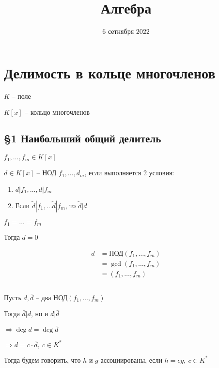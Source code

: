 


    \title{Алгебра}
    \date{6 сетнября 2022}
    \maketitle

    \pagebreak

    \section*{Делимость в кольце многочленов}

    $K$ -- поле
    \par $K[x]$ -- кольцо многочленов

    \subsection*{\S1 Наибольший общий делитель}

    \begin{definition}
        $f_1, \dots, f_m \in K[x]$
        \par \quad $d \in K[x]$ -- НОД $f_1, \dots, d_m$, если выполняется 2 условия:
        \begin{enumerate}
            \item $d | f_1, \dots, d | f_m$
            \item Если $\tilde d | f_1, \dots \tilde d | f_m$, то $\tilde d | d$
        \end{enumerate}
    \end{definition}

    \begin{illustration}
        $f_1 = \dots = f_m$
        \par \quad Тогда $d = 0$
    \end{illustration}

    \begin{remark}[Обозначение]
        \begin{align*}
            d &= \text{НОД}(f_1, \dots, f_m) \\
            &= \gcd (f_1, \dots, f_m) \\
            &= (f_1, \dots, f_m)
        \end{align*}
    \end{remark}

    \begin{remark}
        $ $
        \par \quad Пусть $d, \bar d$ -- два НОД$(f_1, \dots, f_m)$
        \par \quad Тогда $\bar d | d$, но и $d | \bar d$
        \par \quad $\Rightarrow \deg d = \deg \bar d$
        \par \quad $\Rightarrow d = c \cdot \bar d, \ c \in K^*$
        \par Тогда будем говорить, что $h$ и $g$ ассоциированы, если $h = cg, \ c \in K^*$
    \end{remark}

